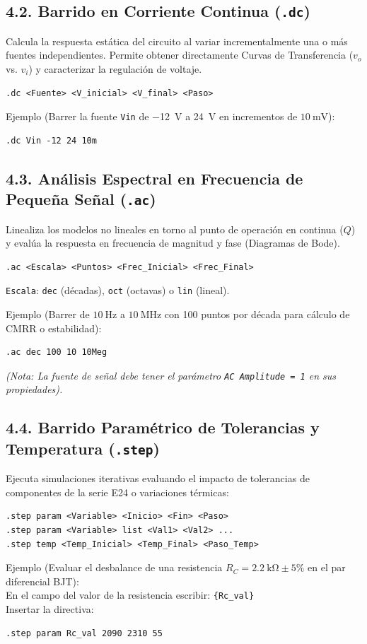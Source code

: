 \documentclass[11pt, a4paper]{article}
\begin{document}
\subsection{4.2. Barrido en Corriente Continua (\texttt{.dc})}
Calcula la respuesta estática del circuito al variar incrementalmente una o más fuentes independientes. Permite obtener directamente Curvas de Transferencia ($v_o$ vs. $v_i$) y caracterizar la regulación de voltaje.
\begin{lstlisting}[style=spicestyle]
.dc <Fuente> <V_inicial> <V_final> <Paso>
\end{lstlisting}
Ejemplo (Barrer la fuente \texttt{Vin} de \qty{-12}{\volt} a \qty{+24}{\volt} en incrementos de $\qty{10}{\milli\volt}$):
\begin{lstlisting}[style=spicestyle]
.dc Vin -12 24 10m
\end{lstlisting}

\subsection{4.3. Análisis Espectral en Frecuencia de Pequeña Señal (\texttt{.ac})}
Linealiza los modelos no lineales en torno al punto de operación en continua ($Q$) y evalúa la respuesta en frecuencia de magnitud y fase (Diagramas de Bode).
\begin{lstlisting}[style=spicestyle]
.ac <Escala> <Puntos> <Frec_Inicial> <Frec_Final>
\end{lstlisting}
\texttt{Escala}: \texttt{dec} (décadas), \texttt{oct} (octavas) o \texttt{lin} (lineal).

Ejemplo (Barrer de $\qty{10}{\hertz}$ a $\qty{10}{\mega\hertz}$ con 100 puntos por década para cálculo de CMRR o estabilidad):
\begin{lstlisting}[style=spicestyle]
.ac dec 100 10 10Meg
\end{lstlisting}
\textit{(Nota: La fuente de señal debe tener el parámetro \texttt{AC Amplitude = 1} en sus propiedades).}

\subsection{4.4. Barrido Paramétrico de Tolerancias y Temperatura (\texttt{.step})}
Ejecuta simulaciones iterativas evaluando el impacto de tolerancias de componentes de la serie E24 o variaciones térmicas:
\begin{lstlisting}[style=spicestyle]
.step param <Variable> <Inicio> <Fin> <Paso>
.step param <Variable> list <Val1> <Val2> ...
.step temp <Temp_Inicial> <Temp_Final> <Paso_Temp>
\end{lstlisting}
Ejemplo (Evaluar el desbalance de una resistencia $R_C = \qty{2.2}{\kilo\ohm} \pm 5\%$ en el par diferencial BJT):\\
En el campo del valor de la resistencia escribir: \texttt{\{Rc\_val\}}\\
Insertar la directiva:
\begin{lstlisting}[style=spicestyle]
.step param Rc_val 2090 2310 55
\end{lstlisting}
\end{document}
